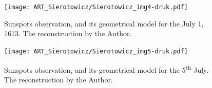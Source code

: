 \begin{artengenv}
\begin{figure}[h]
	\centering
	\texttt{[image: ART\_Sierotowicz/Sierotowicz\_img4-druk.pdf]} 
	\caption{Sunspots observation, and its geometrical model for the July 1, 1613. The reconstruction
		by the Author.}
	\label{sier-fig4}
\end{figure}

\begin{figure}[h]
	\centering
	\texttt{[image: ART\_Sierotowicz/Sierotowicz\_img5-druk.pdf]} 
	\caption{Sunspots observation, and its geometrical model for the 5\textsuperscript{th} July. The reconstruction by the
		Author.}
	\label{sier-fig5}
\end{figure}







\end{artengenv}